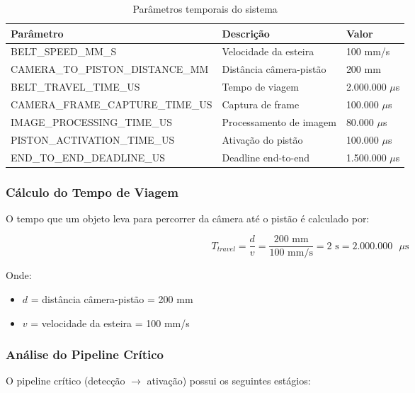 \documentclass[12pt,a4paper]{article}
\begin{document}
\begin{table}[H]
\centering
\begin{tabularx}{\textwidth}{lXl}
\toprule
\textbf{Parâmetro} & \textbf{Descrição} & \textbf{Valor} \\
\midrule
BELT\_SPEED\_MM\_S & Velocidade da esteira & 100 mm/s \\
CAMERA\_TO\_PISTON\_DISTANCE\_MM & Distância câmera-pistão & 200 mm \\
BELT\_TRAVEL\_TIME\_US & Tempo de viagem & 2.000.000 $\mu$s \\
CAMERA\_FRAME\_CAPTURE\_TIME\_US & Captura de frame & 100.000 $\mu$s \\
IMAGE\_PROCESSING\_TIME\_US & Processamento de imagem & 80.000 $\mu$s \\
PISTON\_ACTIVATION\_TIME\_US & Ativação do pistão & 100.000 $\mu$s \\
END\_TO\_END\_DEADLINE\_US & Deadline end-to-end & 1.500.000 $\mu$s \\
\bottomrule
\end{tabularx}
\caption{Parâmetros temporais do sistema}
\end{table}

\subsubsection{Cálculo do Tempo de Viagem}

O tempo que um objeto leva para percorrer da câmera até o pistão é calculado por:

\begin{equation}
T_{travel} = \frac{d}{v} = \frac{200 \text{ mm}}{100 \text{ mm/s}} = 2 \text{ s} = 2.000.000 \text{ } \mu\text{s}
\end{equation}

Onde:
\begin{itemize}
    \item $d$ = distância câmera-pistão = 200 mm
    \item $v$ = velocidade da esteira = 100 mm/s
\end{itemize}

\subsubsection{Análise do Pipeline Crítico}

O pipeline crítico (detecção $\rightarrow$ ativação) possui os seguintes estágios:
\end{document}
